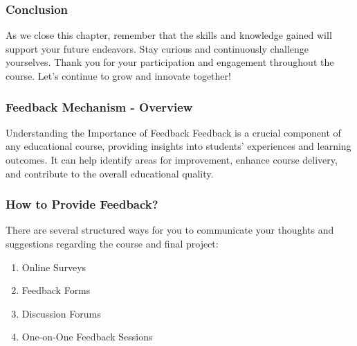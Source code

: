 \documentclass[aspectratio=169]{beamer}
\begin{document}
\begin{frame}[fragile]
    \frametitle{Conclusion}
    As we close this chapter, remember that the skills and knowledge gained will support your future endeavors. 
    Stay curious and continuously challenge yourselves. Thank you for your participation and engagement throughout the course.
    Let’s continue to grow and innovate together!
\end{frame}

\begin{frame}[fragile]
  \frametitle{Feedback Mechanism - Overview}
  \begin{block}{Understanding the Importance of Feedback}
    Feedback is a crucial component of any educational course, providing insights into students' experiences and learning outcomes. It can help identify areas for improvement, enhance course delivery, and contribute to the overall educational quality.
  \end{block}
\end{frame}

\begin{frame}[fragile]
  \frametitle{How to Provide Feedback?}
  There are several structured ways for you to communicate your thoughts and suggestions regarding the course and final project:
  \begin{enumerate}
    \item Online Surveys
    \item Feedback Forms
    \item Discussion Forums
    \item One-on-One Feedback Sessions
  \end{enumerate}
\end{frame}
\end{document}
